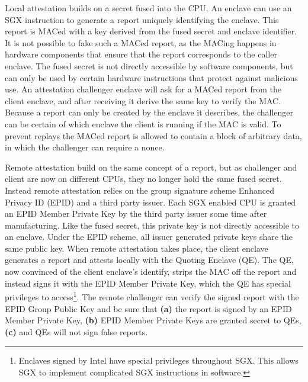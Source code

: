 \documentclass[12pt]{article}
\begin{document}
      Local attestation builds on a secret fused into the CPU.
      An enclave can use an SGX instruction to generate a report uniquely identifying the enclave.
      This report is MACed with a key derived from the fused secret and enclave identifier.
      It is not possible to fake such a MACed report, as the MACing happens in hardware components that ensure that the report corresponds to the caller enclave.
      The fused secret is not directly accessible by software components, but can only be used by certain hardware instructions that protect against malicious use.
      An attestation challenger enclave will ask for a MACed report from the client enclave, and after receiving it derive the same key to verify the MAC.
      Because a report can only be created by the enclave it describes, the challenger can be certain of which enclave the client is running if the MAC is valid.
      To prevent replays the MACed report is allowed to contain a block of arbitrary data, in which the challenger can require a nonce.
      
      Remote attestation build on the same concept of a report, but as challenger and client are now on different CPUs, they no longer hold the same fused secret.
      Instead remote attestation relies on the group signature scheme Enhanced Privacy ID (EPID) and a third party issuer.
      Each SGX enabled CPU is granted an EPID Member Private Key by the third party issuer some time after manufacturing.
      Like the fused secret, this private key is not directly accessible to an enclave.
      Under the EPID scheme, all issuer generated private keys share the same public key.
      When remote attestation takes place, the client enclave generates a report and attests locally with the Quoting Enclave (QE).
      The QE, now convinced of the client enclave's identify, strips the MAC off the report and instead signs it with the EPID Member Private Key, which the QE has special privileges to access\footnote{Enclaves signed by Intel have special privileges throughout SGX. This allows SGX to implement complicated SGX instructions in software.}.
      The remote challenger can verify the signed report with the EPID Group Public Key and be sure that \textbf{(a)} the report is signed by an EPID Member Private Key, \textbf{(b)} EPID Member Private Keys are granted secret to QEs, \textbf{(c)} and QEs will not sign false reports.
\end{document}
